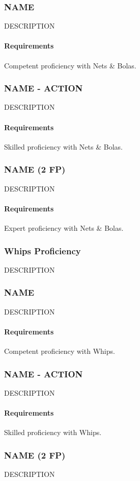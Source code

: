 \subsubsection{NAME} \label{feat::name}
    DESCRIPTION
    \paragraph{Requirements} Competent proficiency with Nets \& Bolas.
\subsubsection{NAME - ACTION} \label{feat::name}
    DESCRIPTION
    \paragraph{Requirements} Skilled proficiency with Nets \& Bolas.
\subsubsection{NAME (2 FP)} \label{feat::name}
    DESCRIPTION
    \paragraph{Requirements} Expert proficiency with Nets \& Bolas.
\subsubsection{Whips Proficiency} \label{feat::name}
    DESCRIPTION
\subsubsection{NAME} \label{feat::name}
    DESCRIPTION
    \paragraph{Requirements} Competent proficiency with Whips.
\subsubsection{NAME - ACTION} \label{feat::name}
    DESCRIPTION
    \paragraph{Requirements} Skilled proficiency with Whips.
\subsubsection{NAME (2 FP)} \label{feat::name}
    DESCRIPTION

